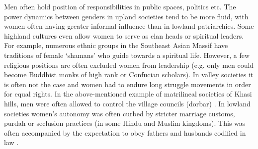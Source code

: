 \begin{sloppypar}
 Men often hold position of responsibilities in public spaces, politics etc. The power dynamics between genders in upland societies tend to be more fluid, with women often having greater informal influence than in lowland patriarchies. Some highland cultures even allow women to serve as clan heads or spiritual leaders.  For example, numerous ethnic groups in the Southeast Asian Massif have traditions of female `shamans'  who guide towards a spiritual life. However, a few religious positions are often excluded women from leadership (e.g. only men could become Buddhist monks of high rank or Confucian scholars). In valley societies it is often not the case and women had to endure long struggle movements in order for equal rights. In the above\hyp{}mentioned example of matrilineal societies of Khasi hills, men were often allowed to control the  village councils (dorbar) \citep{WashingtonPost_2015,TheGuardian2011}. In lowland societies women’s autonomy was often curbed by stricter marriage customs, purdah or seclusion practices (in some Hindu and Muslim kingdoms). This was often accompanied by the expectation to obey fathers and husbands codified in law \citep{Papanek_1973,Devi2019}.
\end{sloppypar}

